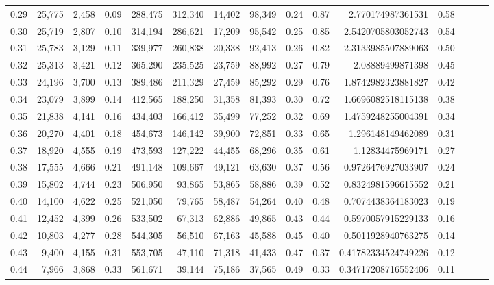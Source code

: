 \begin{tabular}{rrrrrrrrrrrrrrr}
0.29 &  25,775 &  2,458 &  0.09 &  288,475 &  312,340 &   14,402 &   98,349 &  0.24 &  0.87 &       2.770174987361531 &      0.58 \\
0.30 &  25,719 &  2,807 &  0.10 &  314,194 &  286,621 &   17,209 &   95,542 &  0.25 &  0.85 &      2.5420705803052743 &      0.54 \\
0.31 &  25,783 &  3,129 &  0.11 &  339,977 &  260,838 &   20,338 &   92,413 &  0.26 &  0.82 &      2.3133985507889063 &      0.50 \\
0.32 &  25,313 &  3,421 &  0.12 &  365,290 &  235,525 &   23,759 &   88,992 &  0.27 &  0.79 &        2.08889499871398 &      0.45 \\
0.33 &  24,196 &  3,700 &  0.13 &  389,486 &  211,329 &   27,459 &   85,292 &  0.29 &  0.76 &      1.8742982323881827 &      0.42 \\
0.34 &  23,079 &  3,899 &  0.14 &  412,565 &  188,250 &   31,358 &   81,393 &  0.30 &  0.72 &      1.6696082518115138 &      0.38 \\
0.35 &  21,838 &  4,141 &  0.16 &  434,403 &  166,412 &   35,499 &   77,252 &  0.32 &  0.69 &      1.4759248255004391 &      0.34 \\
0.36 &  20,270 &  4,401 &  0.18 &  454,673 &  146,142 &   39,900 &   72,851 &  0.33 &  0.65 &       1.296148149462089 &      0.31 \\
0.37 &  18,920 &  4,555 &  0.19 &  473,593 &  127,222 &   44,455 &   68,296 &  0.35 &  0.61 &        1.12834475969171 &      0.27 \\
0.38 &  17,555 &  4,666 &  0.21 &  491,148 &  109,667 &   49,121 &   63,630 &  0.37 &  0.56 &      0.9726476927033907 &      0.24 \\
0.39 &  15,802 &  4,744 &  0.23 &  506,950 &   93,865 &   53,865 &   58,886 &  0.39 &  0.52 &      0.8324981596615552 &      0.21 \\
0.40 &  14,100 &  4,622 &  0.25 &  521,050 &   79,765 &   58,487 &   54,264 &  0.40 &  0.48 &      0.7074438364183023 &      0.19 \\
0.41 &  12,452 &  4,399 &  0.26 &  533,502 &   67,313 &   62,886 &   49,865 &  0.43 &  0.44 &      0.5970057915229133 &      0.16 \\
0.42 &  10,803 &  4,277 &  0.28 &  544,305 &   56,510 &   67,163 &   45,588 &  0.45 &  0.40 &      0.5011928940763275 &      0.14 \\
0.43 &   9,400 &  4,155 &  0.31 &  553,705 &   47,110 &   71,318 &   41,433 &  0.47 &  0.37 &     0.41782334524749226 &      0.12 \\
0.44 &   7,966 &  3,868 &  0.33 &  561,671 &   39,144 &   75,186 &   37,565 &  0.49 &  0.33 &     0.34717208716552406 &      0.11 \\

\end{tabular}
